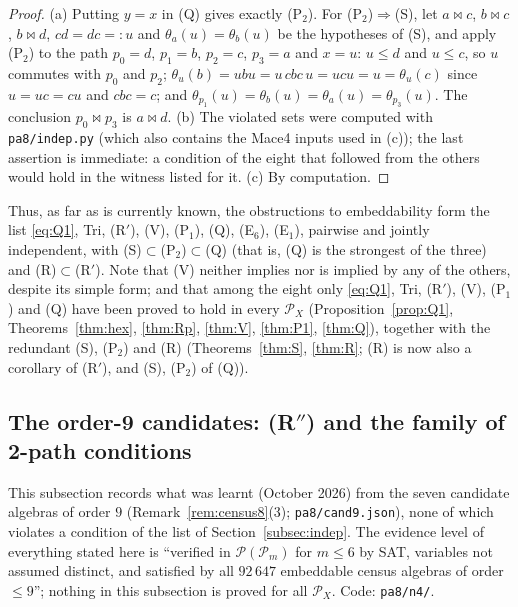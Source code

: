 \documentclass[11pt]{amsart}
\theoremstyle{definition}
\renewcommand{\P}{\mathcal{P}}
\begin{document}
\begin{proof}
(a) Putting $y=x$ in (Q) gives exactly (P$_2$). For (P$_2$)$\Rightarrow$(S), let $a\bowtie c$, $b\bowtie c$, $b\bowtie d$, $cd=dc=:u$ and $\theta_a(u)=\theta_b(u)$ be the hypotheses of (S), and apply (P$_2$) to the path $p_0=d$, $p_1=b$, $p_2=c$, $p_3=a$ and $x=u$: $u\le d$ and $u\le c$, so $u$ commutes with $p_0$ and $p_2$; $\theta_u(b)=ubu=u\,cbc\,u=ucu=u=\theta_u(c)$ since $u=uc=cu$ and $cbc=c$; and $\theta_{p_1}(u)=\theta_b(u)=\theta_a(u)=\theta_{p_3}(u)$. The conclusion $p_0\bowtie p_3$ is $a\bowtie d$.  (b) The violated sets were computed with \texttt{pa8/indep.py} (which also contains the Mace4 inputs used in (c)); the last assertion is immediate: a condition of the eight that followed from the others would hold in the witness listed for it. (c) By computation.
\end{proof}

Thus, as far as is currently known, the obstructions to embeddability form the list \eqref{eq:Q1}, Tri, (R$'$), (V), (P$_1$), (Q), (E$_6$), (E$_1$), pairwise and jointly independent, with (S)$\subset$(P$_2$)$\subset$(Q) (that is, (Q) is the strongest of the three) and (R)$\subset$(R$'$). Note that (V) neither implies nor is implied by any of the others, despite its simple form; and that among the eight only \eqref{eq:Q1}, Tri, (R$'$), (V), (P$_1$) and (Q) have been proved to hold in every $\P_X$ (Proposition~\ref{prop:Q1}, Theorems~\ref{thm:hex}, \ref{thm:Rp}, \ref{thm:V}, \ref{thm:P1}, \ref{thm:Q}), together with the redundant (S), (P$_2$) and (R) (Theorems~\ref{thm:S}, \ref{thm:R}; (R) is now also a corollary of (R$'$), and (S), (P$_2$) of (Q)).

\subsection{The order-9 candidates: (R$''$) and the family of 2-path conditions}\label{subsec:nine}

This subsection records what was learnt (October 2026) from the seven candidate algebras of order $9$ (Remark~\ref{rem:census8}(3); \texttt{pa8/cand9.json}), none of which violates a condition of the list of Section~\ref{subsec:indep}. The evidence level of everything stated here is ``verified in $\P(\P_m)$ for $m\le6$ by SAT, variables not assumed distinct, and satisfied by all $92\,647$ embeddable census algebras of order $\le9$''; nothing in this subsection is proved for all $\P_X$. Code: \texttt{pa8/n4/}.
\end{document}
